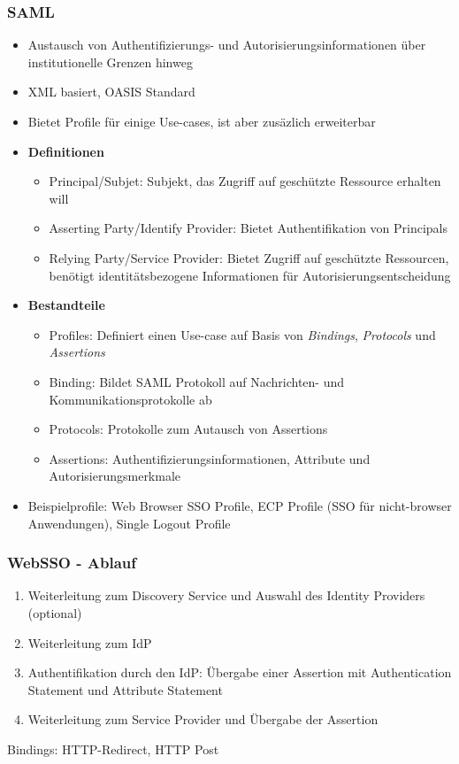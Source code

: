 \subsubsection{SAML}
\begin{itemize}
	\item Austausch von Authentifizierungs- und Autorisierungsinformationen über institutionelle Grenzen hinweg
	\item XML basiert, OASIS Standard
	\item Bietet Profile für einige Use-cases, ist aber zusäzlich erweiterbar
	\item \textbf{Definitionen}
	\begin{itemize}
		\item Principal/Subjet: Subjekt, das Zugriff auf geschützte Ressource erhalten will
		\item Asserting Party/Identify Provider: Bietet Authentifikation von Principals
		\item Relying Party/Service Provider: Bietet Zugriff auf geschützte Ressourcen, benötigt identitätsbezogene Informationen für Autorisierungsentscheidung
	\end{itemize}
	\item \textbf{Bestandteile}
	\begin{itemize}
		\item Profiles: Definiert einen Use-case auf Basis von \textit{Bindings}, \textit{Protocols} und \textit{Assertions}
		\item Binding: Bildet SAML Protokoll auf Nachrichten- und Kommunikationsprotokolle ab
		\item Protocols: Protokolle zum Autausch von Assertions
		\item Assertions: Authentifizierungsinformationen, Attribute und Autorisierungsmerkmale
	\end{itemize}
	\item Beispielprofile: Web Browser SSO Profile, ECP Profile (SSO für nicht-browser Anwendungen), Single Logout Profile
\end{itemize}

\subsubsection{WebSSO - Ablauf}
\begin{enumerate}
	\item Weiterleitung zum Discovery Service und Auswahl des Identity Providers (optional)
	\item Weiterleitung zum IdP
	\item Authentifikation durch den IdP: Übergabe einer Assertion mit Authentication Statement und Attribute Statement
	\item Weiterleitung zum Service Provider und Übergabe der Assertion
\end{enumerate}
Bindings: HTTP-Redirect, HTTP Post

